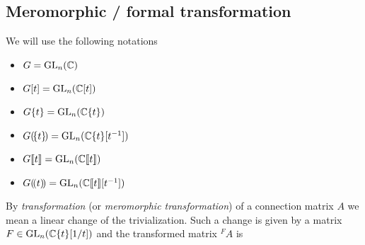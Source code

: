 \subsection{Meromorphic / formal transformation}
\begin{comment}\footnotesize
  see \cite{thboalch} \textbf{Rem 1.41 on p. 16}:
  \begin{rem}
    Note that in most of the recent references we have used, Stokes matrices
    are used to classify
    \begin{itemize}
      \item meromorphic connections within fixed \textbf{formal meromorphic
        classes, modulo meromorphic equivalence}.
    \end{itemize}
    Whereas here we classify
    \begin{itemize}
      \item meromorphic connections within fixed \textbf{formal analytic
        classes, modulo analytic equivalence},
    \end{itemize}
    as is done in the older literature.  The fact is that the sets equivalence
    classes are the same in both cases. It is important for us to work with
    analytic, rather than meromorphic gauge transformations, because then the
    $\C^\infty$ viewpoint in Chapter 3 is cleaner. This distinction relates to
    the difference between \textbf{‘regular singular’} connections and
    \textbf{‘logarithmic’} connections.
  \end{rem}
\end{comment}
\begin{notations}
  We will use the following notations
  \begin{itemize}
    \item $G=\operatorname{GL}_n(\mathbb{C})$
    \item $G[t]=\operatorname{GL}_n(\mathbb{C}[t])$
    \item $G\{t\}=\operatorname{GL}_n(\mathbb{C}\{t\})$
    \item $G(\!\{t\}\!)=\operatorname{GL}_n(\mathbb{C}\{t\}[t^{-1}])$
    \item $G\llbracket t\rrbracket=\operatorname{GL}_n(\mathbb{C}\llbracket t\rrbracket)$
    \item $G(\!(t)\!)=\operatorname{GL}_n(\mathbb{C}\llbracket t\rrbracket[t^{-1}])$
  \end{itemize}
\end{notations}
By \emph{transformation} (or \emph{meromorphic transformation}) of a connection
matrix $A$ we mean a linear change of the trivialization. Such a change is given
by a matrix $F\in\operatorname{GL}_n(\mathbb{C}\{t\}[1/t])$ and the transformed matrix ${}^F\!A$ is
